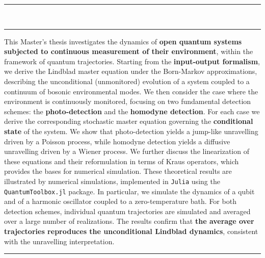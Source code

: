 \thispagestyle{empty}
\vskip 2.5mm
\rule{\textwidth}{0.8pt}\\[-3    mm]
\rule{\textwidth}{0.8pt}
\vskip 2cm
\justifying
\begin{tcolorbox}[colback=white, colframe=black, boxrule=0.6pt, arc=0pt, left=8pt, right=8pt, top=6pt, bottom=6pt]
    \hspace{6mm} This Master's thesis investigates the dynamics of \textbf{open quantum systems subjected to continuous measurement of their environment}, within the framework of quantum trajectories. Starting from the \textbf{input-output formalism}, we derive the Lindblad master equation under the Born-Markov approximations, describing the unconditional (unmonitored) evolution of a system coupled to a continuum of bosonic environmental modes. We then consider the case where the environment is continuously monitored, focusing on two fundamental detection schemes: the \textbf{photo-detection} and the \textbf{homodyne detection}. For each case we derive the corresponding stochastic master equation governing the \textbf{conditional state} of the system. We show that photo-detection yields a jump-like unravelling driven by a Poisson process, while homodyne detection yields a diffusive unravelling driven by a Wiener process. We further discuss the linearization of these equations and their reformulation in terms of Kraus operators, which provides the bases for numerical simulation. These theoretical results are illustrated by numerical simulations, implemented in \verb|Julia| using the \verb|QuantumToolbox.jl| package. In particular, we simulate the dynamics of a qubit and of a harmonic oscillator coupled to a zero-temperature bath. For both detection schemes, individual quantum trajectories are simulated and averaged over a large number of realizations. The results confirm that \textbf{the average over trajectories reproduces the unconditional Lindblad dynamics}, consistent with the unravelling interpretation.
\end{tcolorbox}
\vspace{1cm}\centering\rule{0.5\textwidth}{1pt}\vspace{1cm}
